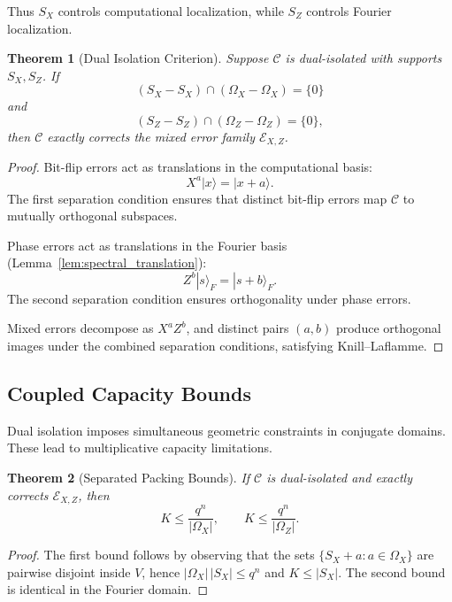 \documentclass[a4paper,twocolumn,11pt,allowtoday]{quantumarticle}
\theoremstyle{plain}
\newtheorem{theorem}{Theorem}[section]
\theoremstyle{definition}
\theoremstyle{remark}
\begin{document}
Thus $S_X$ controls computational localization,
while $S_Z$ controls Fourier localization.

\begin{theorem}[Dual Isolation Criterion]
\label{thm:dual_isolation}
Suppose $\mathcal{C}$ is dual-isolated with supports
$S_X,S_Z$.
If
\[
(S_X-S_X)\cap(\Omega_X-\Omega_X)=\{0\}
\]
and
\[
(S_Z-S_Z)\cap(\Omega_Z-\Omega_Z)=\{0\},
\]
then $\mathcal{C}$ exactly corrects the mixed error family
$\mathcal{E}_{X,Z}$.
\end{theorem}

\begin{proof}
Bit-flip errors act as translations in the computational basis:
\[
X^a |x\rangle = |x+a\rangle.
\]
The first separation condition ensures that
distinct bit-flip errors map $\mathcal{C}$
to mutually orthogonal subspaces.

Phase errors act as translations in the Fourier basis
(Lemma~\ref{lem:spectral_translation}):
\[
Z^b |s\rangle_F = |s+b\rangle_F.
\]
The second separation condition ensures orthogonality
under phase errors.

Mixed errors decompose as $X^a Z^b$,
and distinct pairs $(a,b)$ produce
orthogonal images under the combined separation
conditions, satisfying Knill--Laflamme.
\end{proof}







\subsection{Coupled Capacity Bounds}
\label{subsec:coupled_bounds}

Dual isolation imposes simultaneous geometric constraints
in conjugate domains. These lead to multiplicative
capacity limitations.

\begin{theorem}[Separated Packing Bounds]
\label{thm:separated_packing}
If $\mathcal{C}$ is dual-isolated and exactly corrects
$\mathcal{E}_{X,Z}$, then
\[
K \le \frac{q^n}{|\Omega_X|},
\qquad
K \le \frac{q^n}{|\Omega_Z|}.
\]
\end{theorem}

\begin{proof}
The first bound follows by observing that the sets
$\{S_X+a : a\in\Omega_X\}$ are pairwise disjoint
inside $V$, hence
$|\Omega_X|\,|S_X|\le q^n$
and $K\le |S_X|$.
The second bound is identical in the Fourier domain.
\end{proof}
\end{document}
